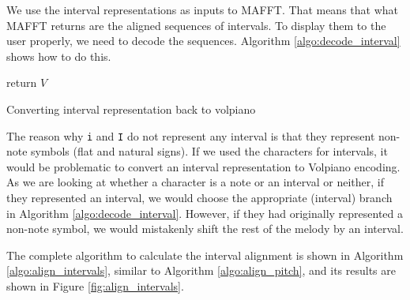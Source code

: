 We use the interval representations as inputs to MAFFT. That means that what MAFFT returns are the aligned sequences of intervals. To display them to the user
properly, we need to decode the sequences. Algorithm \ref{algo:decode_interval} shows how to do this.\newline

\begin{algorithm}[H]
    \BlankLine
    return $V$\;
    \caption{Converting interval representation back to volpiano}
    \label{algo:decode_interval}
\end{algorithm}

The reason why \verb|i| and \verb|I| do not represent any interval is that they represent non-note symbols (flat and natural signs). If we used the characters for intervals,
it would be problematic to convert an interval representation to Volpiano encoding. As we are looking at whether a character is a note or an interval or neither, 
if they represented an interval, we would choose the appropriate (interval) branch in Algorithm \ref{algo:decode_interval}. However, if they had originally represented
a non-note symbol, we would mistakenly shift the rest of the melody by an interval. 

The complete algorithm to calculate the interval alignment is shown in Algorithm \ref{algo:align_intervals}, similar to Algorithm \ref{algo:align_pitch}, and its results
are shown in Figure \ref{fig:align_intervals}.\newline

